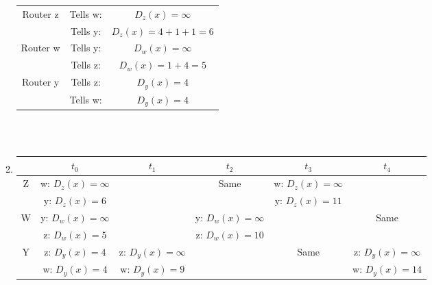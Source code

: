 \documentclass[12pt]{article}
\begin{document}
\begin{enumerate}
\begin{enumerate}
\begin{tabular}{c|c c}
					Router z & Tells w: & $D_z(x) = \infty$\\
					& Tells y: & $D_z(x) = 4+1+1 = 6$\\
					\hline
					Router w & Tells y: & $D_w(x) = \infty$\\
					& Tells z: & $D_w(x) = 1 + 4 = 5$\\
					\hline
					Router y & Tells z: & $D_y(x) = 4$\\
					& Tells w: & $D_y(x) = 4$\\

				\end{tabular}
				\\
				\\

			\item \footnotesize
				\begin{tabular}{c|c|c|c|c|c}

					& $t_0$ & $t_1$ & $t_2$ & $t_3$ & $t_4$\\
					\hline
					Z & w: $D_z(x) = \infty$ & & Same & w: $D_z(x) = \infty$ &\\
					& y: $D_z(x) = 6$ & & & y: $D_z(x) = 11$ & \\
					\hline
					W & y: $D_w(x) = \infty$ & & y: $D_w(x) = \infty$ & & Same\\
					& z: $D_w(x) = 5$ & & z: $D_w(x) = 10$ & &\\
					\hline
					Y & z: $D_y(x) = 4$ & z: $D_y(x) = \infty$ & & Same & z: $D_y(x) = \infty$\\
					& w: $D_y(x) = 4$ & w: $D_y(x) = 9$ & & & w: $D_y(x) = 14$\\


\end{tabular}
\end{enumerate}
\end{enumerate}
\end{document}
